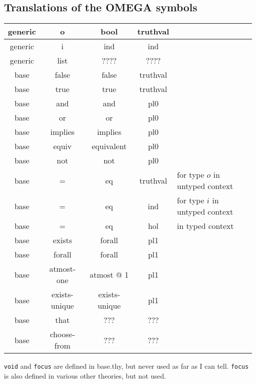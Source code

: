 \documentclass{article}
\begin{document}
\begin{appendix}
  \section{Translations of the OMEGA symbols}
  \begin{tabular}{|c|c||c|c||l|}\hline
    generic & o & bool & truthval & \\\hline
    generic & i & ind & ind & \\\hline
    generic & list & ???? & ???? & \\\hline\hline
    base & false & false & truthval & \\\hline
    base & true & true & truthval & \\\hline
    base & and & and & pl0 & \\\hline
    base & or  & or & pl0  & \\\hline
    base & implies & implies & pl0 & \\\hline
    base & equiv & equivalent & pl0 & \\\hline 
    base & not & not & pl0  & \\\hline
    base & = & eq & truthval & for type $o$ in untyped context\\\hline
    base & = & eq & ind & for type $i$ in untyped context\\\hline
    base & = & eq & hol & in typed context\\\hline
    base & exists & forall & pl1 & \\\hline
    base & forall & forall & pl1 & \\\hline 
    base & atmost-one & atmost @ 1 & pl1 & \\\hline
    base & exists-unique & exists-unique & pl1 & \\\hline
    base & that & ??? & ???& \\\hline 
    base & choose-from & ??? & ??? & \\\hline 
  \end{tabular}
  
  {\tt{void}} and {\tt{focus}} are defined in base.thy, but never used as far as I
  can tell. {\tt{focus}} is also defined in various other theories, but not used.

\end{appendix}
\end{document}
